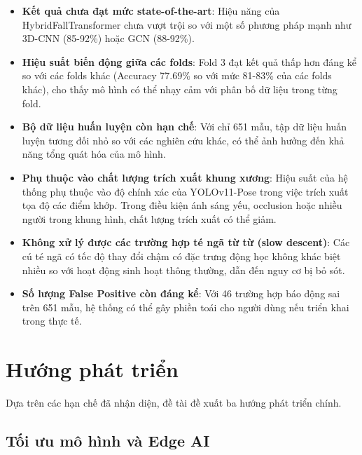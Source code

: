 \begin{itemize}
    \item \textbf{Kết quả chưa đạt mức state-of-the-art}: Hiệu năng của HybridFallTransformer chưa vượt trội so với một số phương pháp mạnh như 3D-CNN (85-92\%) hoặc GCN (88-92\%).
    
    \item \textbf{Hiệu suất biến động giữa các folds}: Fold 3 đạt kết quả thấp hơn đáng kể so với các folds khác (Accuracy 77.69\% so với mức 81-83\% của các folds khác), cho thấy mô hình có thể nhạy cảm với phân bố dữ liệu trong từng fold.
    
    \item \textbf{Bộ dữ liệu huấn luyện còn hạn chế}: Với chỉ 651 mẫu, tập dữ liệu huấn luyện tương đối nhỏ so với các nghiên cứu khác, có thể ảnh hưởng đến khả năng tổng quát hóa của mô hình.
    
    \item \textbf{Phụ thuộc vào chất lượng trích xuất khung xương}: Hiệu suất của hệ thống phụ thuộc vào độ chính xác của YOLOv11-Pose trong việc trích xuất tọa độ các điểm khớp. Trong điều kiện ánh sáng yếu, occlusion hoặc nhiều người trong khung hình, chất lượng trích xuất có thể giảm.
    
    \item \textbf{Không xử lý được các trường hợp té ngã từ từ (slow descent)}: Các cú té ngã có tốc độ thay đổi chậm có đặc trưng động học không khác biệt nhiều so với hoạt động sinh hoạt thông thường, dẫn đến nguy cơ bị bỏ sót.
    
    \item \textbf{Số lượng False Positive còn đáng kể}: Với 46 trường hợp báo động sai trên 651 mẫu, hệ thống có thể gây phiền toái cho người dùng nếu triển khai trong thực tế.
\end{itemize}

\section{Hướng phát triển}
\label{sec:future_work}

Dựa trên các hạn chế đã nhận diện, đề tài đề xuất ba hướng phát triển chính.

\subsection{Tối ưu mô hình và Edge AI}
\label{sec:future_edge}

